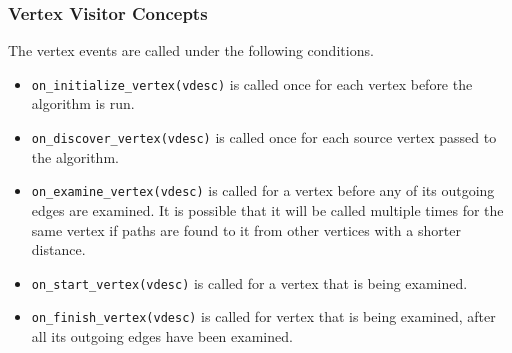 \subsubsection{Vertex Visitor Concepts}
{\small
      
}
The vertex events are called under the following conditions.
\begin{itemize}
      \item \lstinline{on_initialize_vertex(vdesc)} is called once for each vertex before
            the algorithm is run.
      \item \lstinline{on_discover_vertex(vdesc)} is called once for each source vertex passed
            to the algorithm.
      \item \lstinline{on_examine_vertex(vdesc)} is called for a vertex before any of 
            its outgoing edges are examined. It is possible that it will be called multiple times 
            for the same vertex if paths are found to it from other vertices with a shorter distance.
      \item \lstinline{on_start_vertex(vdesc)} is called for a vertex that is being examined.
      \item \lstinline{on_finish_vertex(vdesc)} is called for vertex that is being examined,
            after all its outgoing edges have been examined.
\end{itemize}

